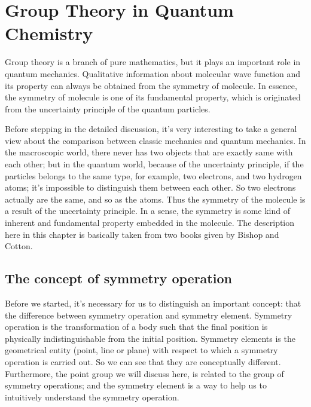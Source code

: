 %
%
%
%

\chapter{Group Theory in Quantum Chemistry}
%
%
%
Group theory is a branch of pure mathematics, but it plays an
important role in quantum mechanics. Qualitative information about
molecular wave function and its property can always be obtained from
the symmetry of molecule. In essence, the symmetry of molecule is one
of its fundamental property, which is originated from the uncertainty
principle of the quantum particles.

Before stepping in the detailed discussion, it's very interesting to
take a general view about the comparison between classic mechanics and
quantum mechanics. In the macroscopic world, there never has two
objects that are exactly same with each other; but in the quantum
world, because of the uncertainty principle, if the particles belongs
to the same type, for example, two electrons, and two hydrogen atoms;
it's impossible to distinguish them between each other. So two
electrons actually are the same, and so as the atoms.  Thus the
symmetry of the molecule is a result of the uncertainty principle. In
a sense, the symmetry is some kind of inherent and fundamental
property embedded in the molecule. The description here in this
chapter is basically taken from two books given by Bishop\cite{Bishop}
and Cotton\cite{Cotton}.

\section{The concept of symmetry operation}\label{GROUP13}
%
%
Before we started, it's necessary for us to distinguish an important
concept: that the difference between symmetry operation and symmetry
element. Symmetry operation is the transformation of a body such that
the final position is physically indistinguishable from the initial
position. Symmetry elements is the geometrical entity (point, line or
plane) with respect to which a symmetry operation is carried out. So
we can see that they are conceptually different.  Furthermore, the
point group we will discuss here, is related to the group of symmetry
operations; and the symmetry element is a way to help us to
intuitively understand the symmetry operation.

